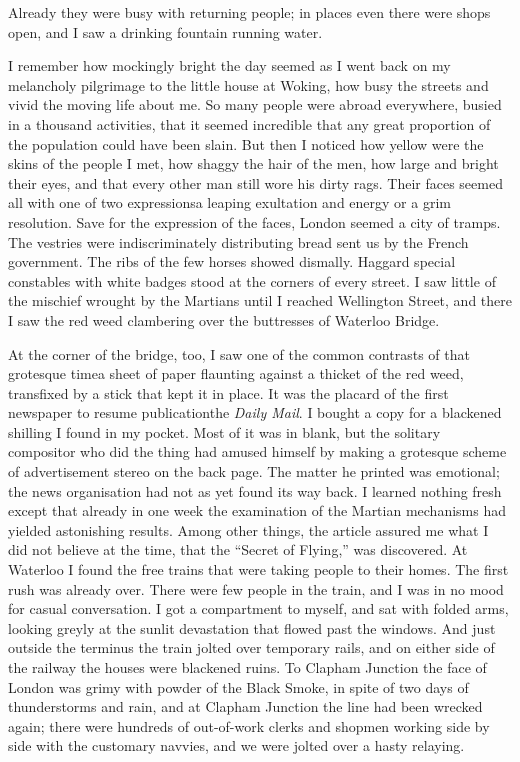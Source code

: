 Already they were busy with returning people; in places even there
were shops open, and I saw a drinking fountain running water.

I remember how mockingly bright the day seemed as I went back on my
melancholy pilgrimage to the little house at Woking, how busy the
streets and vivid the moving life about me. So many people were
abroad everywhere, busied in a thousand activities, that it seemed
incredible that any great proportion of the population could have
been slain. But then I noticed how yellow were the skins of the
people I met, how shaggy the hair of the men, how large and bright
their eyes, and that every other man still wore his dirty rags.
Their faces seemed all with one of two expressions\dash{}a leaping
exultation and energy or a grim resolution. Save for the expression
of the faces, London seemed a city of tramps. The vestries were
indiscriminately distributing bread sent us by the French
government. The ribs of the few horses showed dismally. Haggard
special constables with white badges stood at the corners of every
street. I saw little of the mischief wrought by the Martians until
I reached Wellington Street, and there I saw the red weed
clambering over the buttresses of Waterloo Bridge.

At the corner of the bridge, too, I saw one of the common contrasts
of that grotesque time\dash{}a sheet of paper flaunting against a
thicket of the red weed, transfixed by a stick that kept it in
place. It was the placard of the first newspaper to resume
publication\dash{}the \emph{Daily Mail}. I bought a copy for a blackened
shilling I found in my pocket. Most of it was in blank, but the
solitary compositor who did the thing had amused himself by making
a grotesque scheme of advertisement stereo on the back page. The
matter he printed was emotional; the news organisation had not as
yet found its way back. I learned nothing fresh except that already
in one week the examination of the Martian mechanisms had yielded
astonishing results. Among other things, the article assured me
what I did not believe at the time, that the ``Secret of Flying,''
was discovered. At Waterloo I found the free trains that were
taking people to their homes. The first rush was already over.
There were few people in the train, and I was in no mood for casual
conversation. I got a compartment to myself, and sat with folded
arms, looking greyly at the sunlit devastation that flowed past the
windows. And just outside the terminus the train jolted over
temporary rails, and on either side of the railway the houses were
blackened ruins. To Clapham Junction the face of London was grimy
with powder of the Black Smoke, in spite of two days of
thunderstorms and rain, and at Clapham Junction the line had been
wrecked again; there were hundreds of out-of-work clerks and
shopmen working side by side with the customary navvies, and we
were jolted over a hasty relaying.

